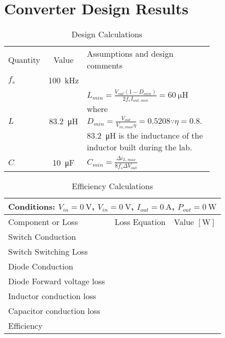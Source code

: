 \section{Converter Design Results}
\begin{table}[h]
	\centering
	\caption{Design Calculations}
	\begin{tabular}{lcp{0.8\linewidth}}
		\toprule
		Quantity&Value&Assumptions and design comments\\
		\cmidrule(r){1-1}\cmidrule(lr){2-2}\cmidrule(l){3-3}
		$f_s$ & \SI{100}{\kilo\hertz} & \\
		$L$ & \SI{83.2}{\micro\henry} & $L_{min} = \frac{V_{out}(1-D_{min})}{2 f_s I_{out,min}} = \SI{60}{\micro\henry}$ where $D_{min}=\frac{V_{out}}{V_{in,max}\eta} = 0.5208 \because \eta=0.8$.  \SI{83.2}{\micro\henry} is the inductance of the inductor built during the lab.\\
		$C$ & \SI{10}{\micro\farad} & $C_{min}=\frac{\Delta i_{L,max}}{8 f_s \Delta V_{out}}$\\
		\bottomrule
	\end{tabular}
	\label{tab:converter:design calculations}
\end{table}

\begin{table}[h]
	\centering
	\caption{Efficiency Calculations}
	\begin{tabular}{lcl}
		\toprule
		\multicolumn{3}{l}{Conditions: $V_{in}=\SI{0}{\volt}$, $V_{in}=\SI{0}{\volt}$, $I_{out}=\SI{0}{\ampere}$, $P_{out}=\SI{0}{\watt}$}\\
		\midrule
		Component or Loss&Loss Equation&Value $\left[\si{\watt}\right]$\\
		\cmidrule(r){1-1}\cmidrule(lr){2-2}\cmidrule(l){3-3}
		Switch Conduction & & \\
		Switch Switching Loss & & \\
		Diode Conduction & & \\
		Diode Forward voltage loss & & \\
		Inductor conduction loss & & \\
		Capacitor conduction loss & & \\
		Efficiency & & \\
		\bottomrule
	\end{tabular}
	\label{tab:converter:efficiency calculations}
\end{table}